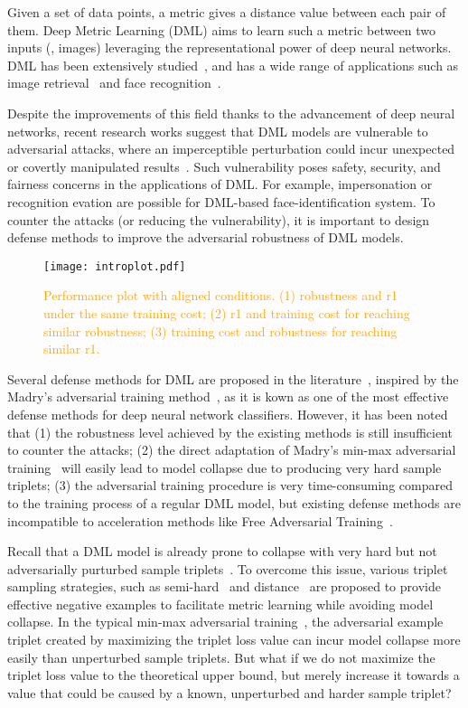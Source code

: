 \documentclass[10pt,twocolumn,letterpaper]{article}
\newcommand{\oo}[1]{\textcolor{orange}{#1}}
\begin{document}

Given a set of data points, a metric gives a distance value between each pair
of them.
%
Deep Metric Learning (DML) aims to learn such a metric between two inputs (\eg,
images) leveraging the representational power of deep neural networks.
%
DML has been extensively studied~\cite{revisiting}, and has a
wide range of applications such
as image retrieval~\cite{imagesim2} and face recognition~\cite{facenet,domainface}.

Despite the improvements of this field thanks to the advancement of deep neural
networks, recent research works suggest that DML models are vulnerable to
adversarial attacks, where an imperceptible perturbation could incur unexpected
or covertly manipulated results~\cite{advrank,advorder}.
%
Such vulnerability poses safety, security, and fairness concerns in the
applications of DML.
%
For example, impersonation or recognition evation are possible for DML-based
face-identification system.
%
To counter the attacks (or reducing the vulnerability), it is important to
design defense methods to improve the adversarial robustness of DML models.

\begin{figure}[t]
	\texttt{[image: introplot.pdf]}
	\caption{\oo{Performance plot with aligned conditions.
	(1) robustness and r1 under the same training cost;
	(2) r1 and training cost for reaching similar robustness;
	(3) training cost and robustness for reaching similar r1.}}
	\label{fig:introplot}
\end{figure}

Several defense methods for DML are proposed in the
literature~\cite{advrank,robrank}, inspired by the Madry's adversarial training
method~\cite{madry}, as it is kown as one of the most effective defense methods
for deep neural network classifiers.
%
However, it has been noted that
%
(1) the robustness level achieved by the existing methods is still insufficient
to counter the attacks;
%
(2) the direct adaptation of Madry's min-max adversarial training~\cite{madry} will easily
lead to model collapse due to producing very hard sample triplets;
%
(3) the adversarial training procedure is very time-consuming compared to
the training process of a regular DML model, but existing defense methods
are incompatible to acceleration methods like Free Adversarial Training~\cite{freeat}.

Recall that a DML model is already prone to collapse with very hard but not
adversarially purturbed sample triplets~\cite{facenet}.
%
To overcome this issue, various triplet sampling strategies, such as
semi-hard~\cite{facenet} and distance~\cite{distance} are proposed to provide
effective negative examples to facilitate metric learning while avoiding model
collapse.
%
In the typical min-max adversarial training~\cite{madry}, the adversarial
example triplet created by maximizing the triplet loss value can incur model
collapse more easily than unperturbed sample triplets.
%
But what if we do not maximize the triplet loss value to the theoretical upper
bound, but merely increase it towards a value that could be caused by
a known, unperturbed and harder sample triplet?
\end{document}
